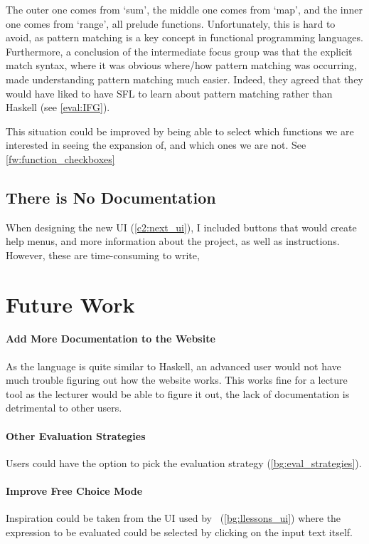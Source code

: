 The outer one comes from `sum', the middle one comes from `map', and the inner one comes from `range', all prelude functions. Unfortunately, this is hard to avoid, as pattern matching is a key concept in functional programming languages. Furthermore, a conclusion of the intermediate focus group was that the explicit match syntax, where it was obvious where/how pattern matching was occurring, made understanding pattern matching much easier. Indeed, they agreed that they would have liked to have SFL to learn about pattern matching rather than Haskell (see \ref{eval:IFG}). 

This situation could be improved by being able to select which functions we are interested in seeing the expansion of, and which ones we are not. See \ref{fw:function_checkboxes}

\subsection{There is No Documentation}
When designing the new UI (\ref{c2:next_ui}), I included buttons that would create help menus, and more information about the project, as well as instructions. However, these are time-consuming to write,

\section{Future Work}
\label{conc:future_work}
\paragraph{Add More Documentation to the Website} As the language is quite similar to Haskell, an advanced user would not have much trouble figuring out how the website works. This works fine for a lecture tool as the lecturer would be able to figure it out, the lack of documentation is detrimental to other users. 
\paragraph{Other Evaluation Strategies}
Users could have the option to pick the evaluation strategy (\ref{bg:eval_strategies}). 
\paragraph{Improve Free Choice Mode}
Inspiration could be taken from the UI used by \llessons\ (\ref{bg:llessons_ui}) where the expression to be evaluated could be selected by clicking on the input text itself. 

